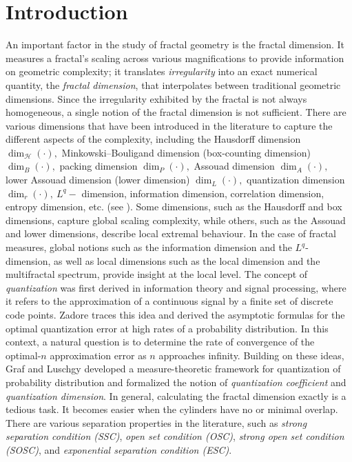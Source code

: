 \documentclass{amsproc}
\theoremstyle{definition}
\theoremstyle{remark}
\numberwithin{equation}{section}
\begin{document}
\section{Introduction}
An important factor in the study of fractal geometry is the fractal dimension. It measures a fractal's scaling across various magnifications to provide information on geometric complexity; it translates \textit{irregularity} into an exact numerical quantity, the \textit{fractal dimension}, that interpolates between traditional geometric dimensions. Since the irregularity exhibited by the fractal is not always homogeneous, a single notion of the fractal dimension is not sufficient. There are various dimensions that have been introduced in the literature to capture the different aspects of the complexity, including the Hausdorff dimension $\dim_\mathcal{H}(\cdot),$ Minkowski–Bouligand dimension (box-counting dimension) $\dim_B(\cdot),$ packing dimension $\dim_P(\cdot),$ Assouad dimension $\dim_A(\cdot),$ lower Assouad dimension (lower dimension) $\dim_L(\cdot),$ quantization dimension $\dim_r(\cdot), ~ L^q-$ dimension, information dimension, correlation dimension, entropy dimension, etc. (see \cite{Fal, Fraser, KNZ1, Mat3, Sh1, Zador, KPot}). Some dimensions, such as the Hausdorff and box dimensions, capture global scaling complexity, while others, such as the Assouad and lower dimensions, describe local extremal behaviour. In the case of fractal measures, global notions such as the information dimension and the $L^q$-dimension, as well as local dimensions such as the local dimension and the multifractal spectrum, provide insight at the local level. 
The concept of \textit{quantization} was first derived in information theory and signal processing, where it refers to the approximation of a continuous signal by a finite set of discrete code points. Zadore \cite{Zador} traces this idea and derived the asymptotic formulas for the optimal quantization error at high rates of a probability distribution. In this context, a natural question is to determine the rate of convergence of the optimal-$n$ approximation error as $n$ approaches infinity. Building on these ideas, Graf and Luschgy \cite{GL1} developed a measure-theoretic framework for quantization of probability distribution and formalized the notion of \textit{quantization coefficient} and \textit{quantization dimension}. In general, calculating the fractal dimension exactly is a tedious task. It becomes easier when the cylinders have no or minimal overlap. There are various separation properties in the literature, such as \textit{strong separation condition (SSC)}, \textit{open set condition (OSC)}, \textit{strong open set condition (SOSC)}, and \textit{exponential separation condition (ESC)}.
\end{document}

